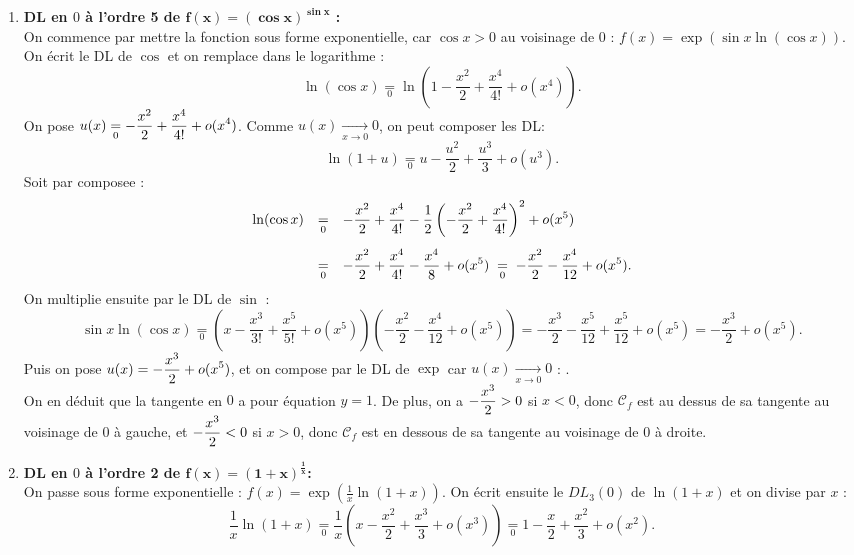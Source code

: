 \documentclass[a4paper, 11pt,reqno]{article}
\begin{document}
\begin{correction}
\begin{enumerate}
		\item \textbf{DL en $0$ \`a l'ordre 5 de $\mathbf{f(x)=(\cos{x})^{\sin{x}}}$ :}\\
		      On commence par mettre la fonction sous forme exponentielle, car $\cos x >0$ au voisinage de $0$ : $f(x) = \exp(\sin x \ln (\cos x))$. On \'ecrit le DL de $\cos$ et on remplace dans le logarithme :
		      $$\ln(\cos x) \underset{0}{=} \ln\left(1-\frac{x^2}{2} + \frac{x^4}{4!} + o(x^4)\right).$$
		      On pose $u(x) \underset{0}{=} \displaystyle-\frac{x^2}{2} + \frac{x^4}{4!} + o(x^4)$.  Comme $u(x) \mathop{\rightarrow}\limits_{x\to 0} 0$, on peut composer les DL:
		      $$\ln(1+u) \underset{0}{=} u-\frac{u^2}{2} + \frac{u^3}{3}+o(u^3).$$
		      Soit par compos\?ee :
		      $$\begin{array}{rcl}
				      \ln(\cos x) & \underset{0}{=} & \ddp -\frac{x^2}{2} + \frac{x^4}{4!} - \frac{1}{2} \left(-\frac{x^2}{2} + \frac{x^4}{4!}\right)^2 + o(x^5) \vsec             \\
				                  & \underset{0}{=} & \ddp -\frac{x^2}{2} + \frac{x^4}{4!} -\frac{x^4}{8} + o(x^5) \; \underset{0}{=} \; -\frac{x^2}{2} - \frac{x^4}{12} + o(x^5).
			      \end{array}$$
		      On multiplie ensuite par le DL de $\sin$ :
		      $$\sin x \ln(\cos x) \underset{0}{=} \left(x-\frac{x^3}{3!} + \frac{x^5}{5!} + o(x^5)\right) \left(-\frac{x^2}{2} -\frac{x^4}{12} + o(x^5)\right) = - \frac{x^3}{2} - \frac{x^5}{12}+ \frac{x^5}{12}+o(x^5) = -\frac{x^3}{2} + o(x^5).$$
		      Puis on pose $u(x) = \displaystyle -\frac{x^3}{2} + o(x^5)$, et on compose par le DL de $\exp$ car $u(x) \mathop{\rightarrow}\limits_{x\to 0} 0$ :
		      .\\
		      On en d\'eduit que la tangente en $0$ a pour \'equation $y=1$. De plus, on a  $-\displaystyle\frac{x^3}{2} >0$ si $x<0$, donc $\mathcal{C}_f$ est au dessus de sa tangente au voisinage de $0$ \`a gauche, et $-\displaystyle\frac{x^3}{2}<0$ si $x>0$, donc $\mathcal{C}_f$ est en dessous de sa tangente au voisinage de $0$ \`a droite.
		\item \textbf{DL en $0$  \`a l'ordre 2 de $\mathbf{f(x)=(1+x)^{\frac{1}{x}}}$:}\\
		      On passe sous forme exponentielle : $f(x)=\exp(\frac{1}{x} \ln (1+x))$. On \'ecrit ensuite le $DL_3(0)$ de $\ln(1+x)$ et on divise par $x$ :
		      $$\frac{1}{x}\ln(1+x)\underset{0}{=} \frac{1}{x}\left( x-\frac{x^2}{2} + \frac{x^3}{3} + o(x^3)\right) \underset{0}{=} 1- \frac{x}{2}+\frac{x^2}{3} + o(x^2).$$

\end{enumerate}
\end{correction}
\end{document}
